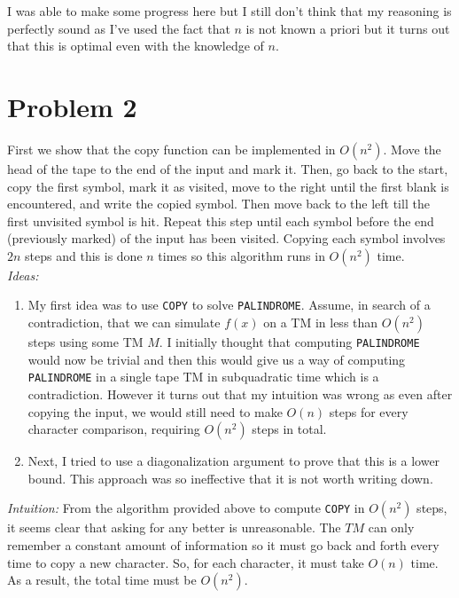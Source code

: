 \documentclass[usletter]{article}
\begin{document}
\begin{remark}
    I was able to make some progress here but I still don't think that my reasoning is perfectly sound as I've used the fact that \(n\) is not known a priori but it turns out that this is optimal 
    even with the knowledge of \(n\).
\end{remark}


\newpage

\section*{Problem 2}
First we show that the copy function can be implemented in \(O(n^2)\). Move the head of the tape to the end of the input and mark it. Then, go back to the start, copy the first symbol,
mark it as visited, move to the right until the first blank is encountered, and write the copied symbol. Then move back to the left till the first unvisited symbol is hit. Repeat this step until each symbol before the end (previously marked) of the input has been 
visited. Copying each symbol involves \(2n\) steps and this is done \(n\) times so this algorithm runs in \(O(n^2)\) time. \\

\emph{Ideas:}

\begin{enumerate}
    \item My first idea was to use \verb|COPY| to solve \verb|PALINDROME|. Assume, in search of a contradiction, that we can simulate \(f(x)\) on a TM in less than \(O(n^2)\) steps using some TM \(M\). I initially thought that computing \verb|PALINDROME| would now be trivial and then this would give
    us a way of computing \verb|PALINDROME| in a single tape TM in subquadratic time which is a contradiction. However
    it turns out that my intuition was wrong as even after copying the input, we would still need to make \(O(n)\) steps for every character comparison, requiring \(O(n^2)\) steps in total. 
    \item Next, I tried to use a diagonalization argument to prove that this is a lower bound. This approach was so ineffective that it is not worth writing down.
\end{enumerate}

\emph{Intuition:} From the algorithm provided above to compute \verb|COPY| in \(O(n^2)\) steps, it seems clear that asking for any better is unreasonable. The \(TM\) can only remember a constant amount of information
so it must go back and forth every time to copy a new character. So, for each character, it must take \(O(n)\) time. As a result, the total time must be \(O(n^2)\).
\end{document}
